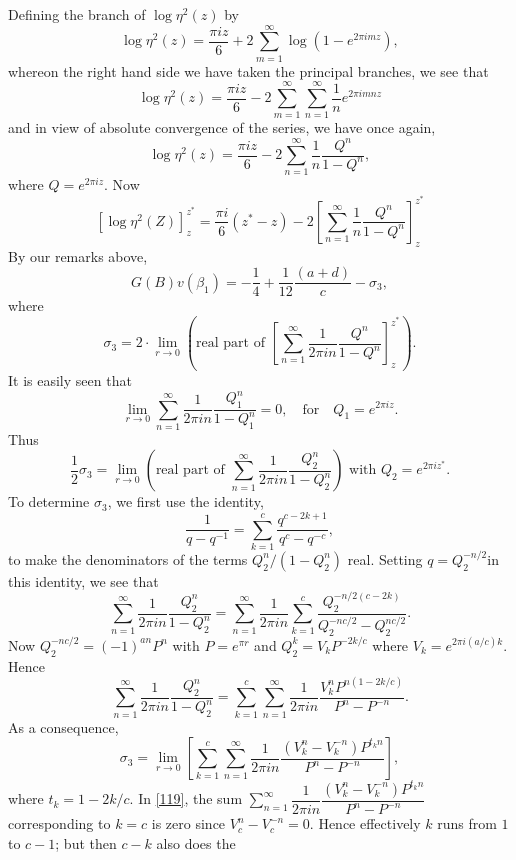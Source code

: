 Defining the branch of $\log \eta^{2}(z)$ by
$$
\log\eta^{2}(z)=\frac{\pi iz}{6}+2\sum^{\infty}_{m=1}\log(1-e^{2\pi
  imz}),
$$
where\pageoriginale on the right hand side we have taken the principal
branches, we see that
$$
\log \eta^{2}(z)=\frac{\pi
  iz}{6}-2\sum^{\infty}_{m=1}\sum^{\infty}_{n=1}\frac{1}{n}e^{2\pi
  imnz}
$$
and in view of absolute convergence of the series, we have once again,
$$
\log\eta^{2}(z)=\frac{\pi
  iz}{6}-2\sum^{\infty}_{n=1}\frac{1}{n}\frac{Q^{n}}{1-Q^{n}},
$$
where $Q=e^{2\pi iz}$. Now
$$
\left[\log\eta^{2}(Z)\right]^{z^{\ast}}_{z}=\frac{\pi
  i}{6}(z^{\ast}-z)-2\left[\sum^{\infty}_{n=1}\frac{1}{n}\frac{Q^{n}}{1-Q^{n}}\right]^{z^{\ast}}_{z} 
$$
By our remarks above,
$$
G(B)v(\beta_{1})=-\frac{1}{4}+\frac{1}{12}\frac{(a+d)}{c}-\sigma_{3},
$$
where
$$
\sigma_{3}=2\cdot \lim\limits_{r\to 0}\left(\text{real part of }
\left[\sum^{\infty}_{n=1}\frac{1}{2\pi
    in}\frac{Q^{n}}{1-Q^{n}}\right]^{z^{\ast}}_{z}\right). 
$$
It is easily seen that
$$
\lim\limits_{r\to 0}\sum^{\infty}_{n=1}\frac{1}{2\pi
  in}\frac{Q^{n}_{1}}{1-Q^{n}_{1}}=0,\quad\text{for}\quad
Q_{1}=e^{2\pi iz}.
$$
Thus
$$
\frac{1}{2}\sigma_{3}=\lim\limits_{r\to 0}\left(\text{real part of }
\sum^{\infty}_{n=1}\frac{1}{2\pi
  in}\frac{Q^{n}_{2}}{1-Q^{n}_{2}}\right)\text{ \  with \ }
Q_{2}=e^{2\pi iz^{\ast}}.
$$
To determine $\sigma_{3}$, we first use the identity,
$$
\frac{1}{q-q^{-1}}=\sum^{c}_{k=1}\frac{q^{c-2k+1}}{q^{c}-q^{-c}},
$$
to make the denominators of the terms $Q^{n}_{2}/(1-Q^{n}_{2})$
real. Setting $q=Q^{-n/2}_{2}$\pageoriginale in this identity, we see
that
$$
\sum^{\infty}_{n=1}\frac{1}{2\pi
  in}\frac{Q^{n}_{2}}{1-Q^{n}_{2}}=\sum^{\infty}_{n=1}\frac{1}{2\pi
  in}\sum^{c}_{k=1} \frac{Q^{-n/2(c-2k)}_{2}}{Q^{-nc/2}_{2}-Q^{nc/2}_{2}}.
$$
Now $Q^{-nc/2}_{2}=(-1)^{an}P^{n}$ with $P=e^{\pi r}$ and
$Q^{k}_{2}=V_{k}P^{-2k/c}$ where $V_{k}=e^{2\pi i(a/c)k}$. Hence
$$
\sum^{\infty}_{n=1}\frac{1}{2\pi
  in}\frac{Q^{n}_{2}}{1-Q^{n}_{2}}=\sum^{c}_{k=1}\sum^{\infty}_{n=1}\frac{1}{2\pi
  in}\frac{V^{n}_{k}P^{n(1-2k/c)}}{P^{n}-P^{-n}}. 
$$
As a consequence,
\begin{equation*}
\sigma_{3}=\lim\limits_{r\to
  0}\left[\sum^{c}_{k=1}\sum^{\infty}_{n=1}\frac{1}{2\pi
    in}   \frac{(V^{n}_{k}-V^{-n}_{k})P^{t_{k}n}}{P^{n}-P^{-n}}
\right],\tag{119}\label{119}  
\end{equation*}
where $t_{k}=1-2k/c$. In \eqref{119}, the sum
$\sum\limits^{\infty}_{n=1}\dfrac{1}{2\pi
  in}\dfrac{(V^{n}_{k}-V^{-n}_{k})P^{t_{k}n}}{P^{n}-P^{-n}}$
corresponding to $k=c$ is zero since $V^{n}_{c}-V^{-n}_{c}=0$. Hence
effectively $k$ runs from $1$ to $c-1$; but then $c-k$ also does the
